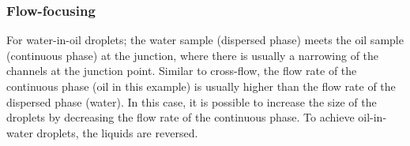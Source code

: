 \subsubsection{Flow-focusing} 
For water-in-oil droplets; the water sample (dispersed phase) meets the oil sample (continuous phase) at the junction, where there is usually a narrowing of the channels at the junction point. Similar to cross-flow, the flow rate of the continuous phase (oil in this example) is usually higher than the flow rate of the dispersed phase (water). In this case, it is possible to increase the size of the droplets by decreasing the flow rate of the continuous phase. To achieve oil-in-water droplets, the liquids are reversed. \parencite{Zhu2017}


